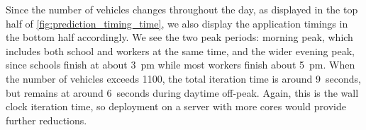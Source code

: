 Since the number of vehicles changes throughout the day, as displayed in the top half of \cref{fig:prediction_timing_time}, we also display the application timings in the bottom half accordingly. We see the two peak periods: morning peak, which includes both school and workers at the same time, and the wider evening peak, since schools finish at about 3~pm while most workers finish about 5~pm. When the number of vehicles exceeds 1100, the total iteration time is around 9~seconds, but remains at around 6~seconds during daytime off-peak. Again, this is the wall clock iteration time, so deployment on a server with more cores would provide further reductions.
